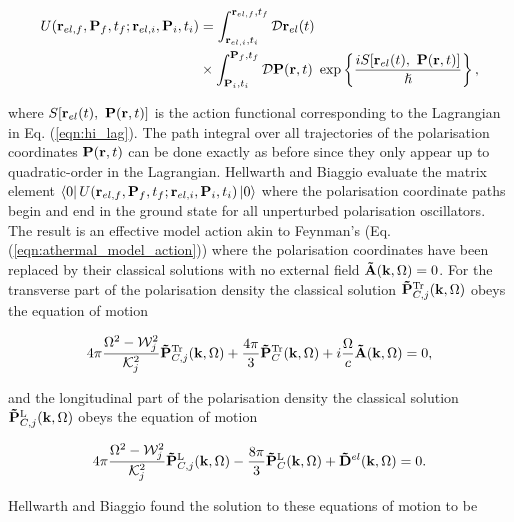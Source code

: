 \begin{equation}
    \begin{aligned}
    U(\vb{r}_{el, f}, \vb{P}_f, t_f; \vb{r}_{el, i}, \vb{P}_i, t_i) &= \int_{\vb{r}_{el, i}, t_i}^{\vb{r}_{el, f}, t_f} \mathcal{D}\vb{r}_{el}(t) \\
    &\times \int_{\vb{P}_i, t_i}^{\vb{P}_f, t_f} \mathcal{D}\vb{P}(\vb{r}, t)\ \exp\left\{{\frac{iS[\vb{r}_{el}(t),\ \vb{P}(\vb{r}, t)]}{\hslash}}\right\},
    \end{aligned}
\end{equation}

where $S[\vb{r}_{el}(t),\ \vb{P}(\vb{r}, t)]$ is the action functional corresponding to the Lagrangian in Eq. (\ref{eqn:hi_lag}). The path integral over all trajectories of the polarisation coordinates $\vb{P}(\vb{r}, t)$ can be done exactly as before since they only appear up to quadratic-order in the Lagrangian. Hellwarth and Biaggio evaluate the matrix element $\bra{0} U(\vb{r}_{el, f}, \vb{P}_f, t_f; \vb{r}_{el, i}, \vb{P}_i, t_i) \ket{0}$ where the polarisation coordinate paths begin and end in the ground state for all unperturbed polarisation oscillators. The result is an effective model action akin to Feynman's (Eq. (\ref{eqn:athermal_model_action})) where the polarisation coordinates have been replaced by their classical solutions with no external field $\vb{\Tilde{A}}(\vb{k}, \Omega) = 0$. For the transverse part of the polarisation density the classical solution $\vb{\Tilde{P}}^{\text{Tr}}_{C, j}(\vb{k}, \Omega)$ obeys the equation of motion

\begin{equation}
    4\pi \frac{\Omega^2 - \mathcal{W}_j^2}{\mathcal{K}_j^2} \vb{\Tilde{P}}^{\text{Tr}}_{C, j}(\vb{k}, \Omega) + \frac{4\pi}{3} \vb{\Tilde{P}}^{\text{Tr}}_{C}(\vb{k}, \Omega) + i \frac{\Omega}{c} \vb{\Tilde{A}}(\vb{k}, \Omega) = 0,
\end{equation}

and the longitudinal part of the polarisation density the classical solution $\vb{\Tilde{P}}^{\text{L}}_{C, j}(\vb{k}, \Omega)$ obeys the equation of motion

\begin{equation}
    4\pi \frac{\Omega^2 - \mathcal{W}_j^2}{\mathcal{K}_j^2} \vb{\Tilde{P}}^{\text{L}}_{C, j}(\vb{k}, \Omega) - \frac{8\pi}{3} \vb{\Tilde{P}}^{\text{L}}_{C}(\vb{k}, \Omega) + \vb{\Tilde{D}}^{el}(\vb{k}, \Omega) = 0.
\end{equation}

Hellwarth and Biaggio found the solution to these equations of motion to be


